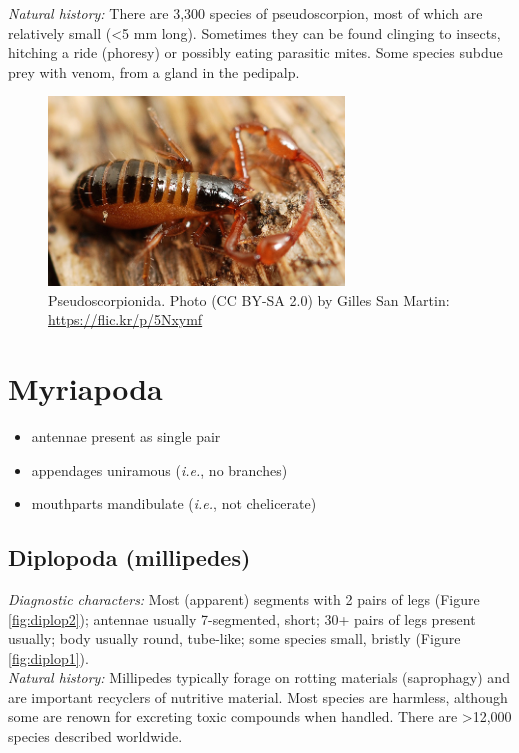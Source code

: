 \documentclass[letterpaper, 11pt]{article}
\begin{document}
\noindent{}\textit{Natural history:} There are 3,300 species of pseudoscorpion, most of which are relatively small (\textless5 mm long). Sometimes they can be found clinging to insects, hitching a ride (phoresy) or possibly eating parasitic mites. Some species subdue prey with venom, from a gland in the pedipalp.\\

\begin{figure}[ht!]
  \centering
    \includegraphics[width=0.7\textwidth]{pseudo}
  \caption{Pseudoscorpionida. Photo (CC BY-SA 2.0) by Gilles San Martin: \url{https://flic.kr/p/5Nxymf}}
  \label{fig:pseudo}
\end{figure}

\section{Myriapoda}
\begin{itemize}
\item antennae present as single pair
\item appendages uniramous (\textit{i.e.}, no branches)
\item mouthparts mandibulate (\textit{i.e.}, not chelicerate)
\end{itemize}

\subsection{Diplopoda (millipedes)}
\noindent{}\textit{Diagnostic characters:} Most (apparent) segments with 2 pairs of legs (Figure \ref{fig:diplop2}); antennae usually 7-segmented, short; 30+ pairs of legs present usually; body usually round, tube-like; some species small, bristly (Figure \ref{fig:diplop1}).\\

\noindent{}\textit{Natural history:} Millipedes typically forage on rotting materials (saprophagy) and are important recyclers of nutritive material. Most species are harmless, although some are renown for excreting toxic compounds when handled. There are \textgreater12,000 species described worldwide.\\
\end{document}

